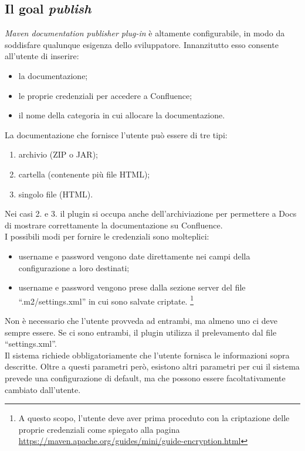 \subsection{Il goal \emph{publish}} \label{goalPublish}
\emph{Maven documentation publisher plug-in} è altamente configurabile, in modo da soddisfare qualunque esigenza dello sviluppatore.
Innanzitutto esso consente all'utente di inserire:
\begin{itemize}
	\item la documentazione;
	\item le proprie credenziali per accedere a Confluence;	
	\item il nome della categoria in cui allocare la documentazione.
\end{itemize}
La documentazione che fornisce l'utente può essere di tre tipi:
\begin{enumerate}
	\item archivio (ZIP o JAR);
	\item cartella (contenente più file HTML);
	\item singolo file (HTML).
\end{enumerate}
Nei casi 2. e 3. il plugin si occupa anche dell'archiviazione per permettere a Docs di mostrare correttamente la documentazione su Confluence. \\
I possibili modi per fornire le credenziali sono molteplici:
\begin{itemize}
	\item username e password vengono date direttamente nei campi della configurazione a loro destinati;
	\item username e password vengono prese dalla sezione server del file ``.m2/settings.xml'' in cui sono salvate criptate. \footnote{A questo scopo, l'utente deve aver prima proceduto con la criptazione delle proprie credenziali come spiegato alla pagina \url{https://maven.apache.org/guides/mini/guide-encryption.html}} 
\end{itemize}
Non è necessario che l'utente provveda ad entrambi, ma almeno uno ci deve sempre essere.
Se ci sono entrambi, il plugin utilizza il prelevamento dal file ``settings.xml''. \\

Il sistema richiede obbligatoriamente che l'utente fornisca le informazioni sopra descritte.
Oltre a questi parametri però, esistono altri parametri per cui il sistema prevede una configurazione di default, ma che possono essere facoltativamente cambiato dall'utente. 


